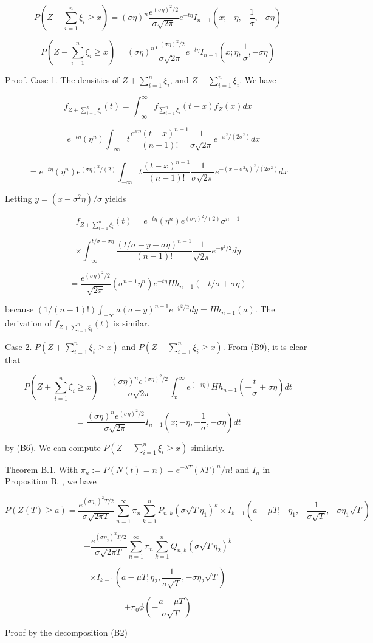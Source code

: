 $$P(Z+\sum_{i=1}^{n}\xi_{i}\geq x) = (\sigma\eta)^{n}\frac{e^{(\sigma\eta)^{2}/2}}{\sigma\sqrt{2\pi}}e^{-t\eta}I_{n-1}(x;-\eta,-\frac{1}{\sigma},-\sigma\eta)$$

$$P(Z-\sum_{i=1}^{n}\xi_{i}\geq x) = (\sigma\eta)^{n}\frac{e^{(\sigma\eta)^{2}/2}}{\sigma\sqrt{2\pi}}e^{-t\eta}I_{n-1}(x;\eta,\frac{1}{\sigma},-\sigma\eta)$$

Proof. Case 1. The densities of $Z+\sum_{i=1}^{n}\xi_{i}$, and $Z-\sum_{i=1}^{n}\xi_{i}$. We have

$$f_{Z+\sum_{i=1}^{n}\xi_{i}}(t)=\int_{-\infty}^{\infty}f_{\sum_{i=1}^{n}\xi_{i}}(t-x)f_{Z}(x)dx$$

$$=e^{-t\eta}(\eta^{n})\int_{-\infty}{t}\frac{e^{x\eta}(t-x)^{n-1}}{(n-1)!}\frac{1}{\sigma\sqrt{2\pi}}e^{-x^{2}/(2\sigma^{2})}dx$$

$$=e^{-t\eta}(\eta^{n})e^{(\sigma\eta)^{2}/(2)}\int_{-\infty}{t}\frac{(t-x)^{n-1}}{(n-1)!}\frac{1}{\sigma\sqrt{2\pi}}e^{-(x-\sigma^{2}\eta)^{2}/(2\sigma^{2})}dx$$

Letting $y=(x-\sigma^{2}\eta)/\sigma$ yields

$$f_{Z+\sum_{i=1}^{n}\xi_{i}}(t)=e^{-t\eta}(\eta^{n})e^{(\sigma\eta)^{2}/(2)}\sigma^{n-1}$$

$$\times\int_{-\infty}^{t/\sigma-\sigma\eta}\frac{(t/\sigma - y -\sigma\eta)^{n-1}}{(n-1)!}\frac{1}{\sqrt{2\pi}}e^{-y^{2}/2}dy$$

$$=\frac{e^{(\sigma\eta)^{2}/2}}{\sqrt{2\pi}}(\sigma^{n-1}\eta^{n})e^{-t\eta}Hh_{n-1}(-t/\sigma + \sigma\eta)$$

because $(1/(n-1)!)\int_{-\infty}{a}(a-y)^{n-1}e^{-y^{2}/2}dy=Hh_{n-1}(a)$. The derivation of $f_{Z+\sum_{i=1}^{n}\xi_{i}}(t)$ is similar.

Case 2. $P(Z+\sum_{i=1}^{n}\xi_{i}\geq x)$ and $P(Z-\sum_{i=1}^{n}\xi_{i}\geq x)$. From (B9), it is clear that

$$P(Z+\sum_{i=1}^{n}\xi_{i}\geq x)=\frac{(\sigma\eta)^{n}e^{(\sigma\eta)^{2}/2}}{\sigma\sqrt{2\pi}}\int_{x}^{\infty}e^{(-i\eta)}Hh_{n-1}(-\frac{t}{\sigma}+\sigma\eta)dt$$

$$=\frac{(\sigma\eta)^{n}e^{(\sigma\eta)^{2}/2}}{\sigma\sqrt{2\pi}}I_{n-1}(x;-\eta,-\frac{1}{\sigma},-\sigma\eta)dt$$

by (B6). We can compute
$P(Z-\sum_{i=1}^{n}\xi_{i}\geq x)$ similarly.

Theorem B.1. With $\pi_{n}:= P(N(t)=n)=e^{-\lambda T}(\lambda T)^{n}/n!$ and $I_{n}$ in Proposition B.
, we have

$$P(Z(T)\geq a)=\frac{e^{(\sigma \eta_{1})^{2} T/2}}{\sigma \sqrt{2 \pi T}} \sum_{n=1}^{\infty} \pi_{n} \sum_{k=1}^{n} P_{n,k}(\sigma\sqrt{T}\eta_{1})^{k}\times I_{k-1}(a-\mu T; -\eta_{1},-\frac{1}{\sigma\sqrt{T}},-\sigma\eta_{1}\sqrt{T})$$

$$+\frac{e^{(\sigma\eta_{2})^{2}T/2}}{\sigma\sqrt{2\pi T}}\sum_{n=1}^{\infty}\pi_{n}\sum_{k=1}^{n}Q_{n,k}(\sigma\sqrt{T}\eta_{2})^{k}$$

$$\times I_{k-1}(a-\mu T; \eta_{2},\frac{1}{\sigma\sqrt{T}},-\sigma\eta_{2}\sqrt{T})$$

$$+\pi_{0}\phi(-\frac{a-\mu T}{\sigma\sqrt{T}})$$

Proof by the decomposition (B2)



%
